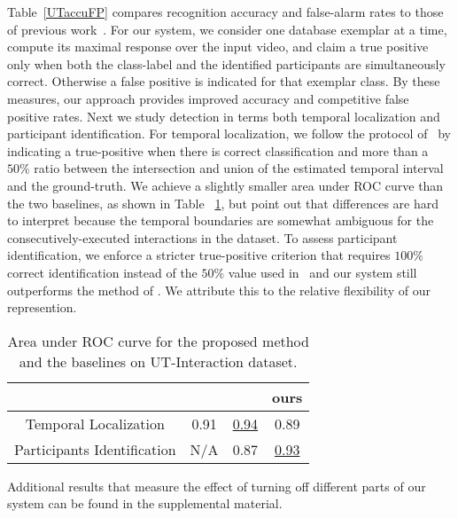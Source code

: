Table~\ref{UTaccuFP} compares recognition accuracy and false-alarm rates to those of previous work~\cite{Ryoo:group,Amer:group}. For our system, we consider one database exemplar at a time, compute its maximal response over the input video, and claim a true positive only when both the class-label and the identified participants are simultaneously correct. Otherwise a false positive is indicated for that exemplar class. By these measures, our approach provides improved accuracy and competitive false positive rates. Next we study detection in terms both temporal localization and participant identification. For temporal localization, we follow the protocol of~\cite{Amer:group} by indicating a true-positive when there is correct classification and more than a $50\%$ ratio between the intersection and union of the estimated temporal interval and the ground-truth. We achieve a slightly smaller area under ROC curve than the two baselines, as shown in Table ~\ref{UTarea}, but point out that differences are hard to interpret because the temporal boundaries are somewhat ambiguous for the consecutively-executed interactions in the dataset. To assess participant identification, we enforce a stricter true-positive criterion that requires $100\%$ correct identification instead of the $50\%$ value used in~\cite{Amer:group} and our system still outperforms the method of \cite{Amer:group}. We attribute this to the relative flexibility of our represention. 

\begin{table}[ht]
\centering \caption{Area under ROC curve for the proposed method and the baselines on UT-Interaction dataset. }
\footnotesize{
\begin{tabular}{|c|c|c|c|}
\hline   & \cite{Ryoo:group} &  \cite{Amer:group}  &   ours \\
\hline Temporal Localization &  0.91 & \underline{0.94} &  0.89\\
\hline Participants Identification &  N/A & 0.87 &  \underline{0.93}   \\
\hline 
\end{tabular}
}
\label{UTarea}
\end{table}

Additional results that measure the effect of turning off different parts of our system can be found in the supplemental material.

